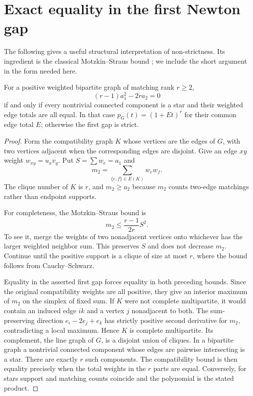 \section{Exact equality in the first Newton gap}\label{sec:firstgap}
The following gives a useful structural interpretation of non-strictness. Its ingredient is the classical Motzkin--Straus bound \cite{MS}; we include the short argument in the form needed here.

\begin{theorem}
For a positive weighted bipartite graph of matching rank $r\ge2$,
\[
 (r-1)a_1^2-2ra_2=0
\]
if and only if every nontrivial connected component is a star and their weighted edge totals are all equal. In that case $p_G(t)=(1+Et)^r$ for their common edge total $E$; otherwise the first gap is strict.
\end{theorem}
\begin{proof}
Form the compatibility graph $K$ whose vertices are the edges of $G$, with two vertices adjacent when the corresponding edges are disjoint. Give an edge $xy$ weight $w_{xy}=u_xv_y$. Put $S=\sum w_e=a_1$ and
\[
 m_2=\sum_{\{e,f\}\in E(K)}w_ew_f.
\]
The clique number of $K$ is $r$, and $m_2\ge a_2$ because $m_2$ counts two-edge matchings rather than endpoint supports.

For completeness, the Motzkin--Straus bound is
\[
 m_2\le\frac{r-1}{2r}S^2.
\]
To see it, merge the weights of two nonadjacent vertices onto whichever has the larger weighted neighbor sum. This preserves $S$ and does not decrease $m_2$. Continue until the positive support is a clique of size at most $r$, where the bound follows from Cauchy--Schwarz.

Equality in the asserted first gap forces equality in both preceding bounds. Since the original compatibility weights are all positive, they give an interior maximum of $m_2$ on the simplex of fixed sum. If $K$ were not complete multipartite, it would contain an induced edge $ik$ and a vertex $j$ nonadjacent to both. The sum-preserving direction $e_i-2e_j+e_k$ has strictly positive second derivative for $m_2$, contradicting a local maximum. Hence $K$ is complete multipartite. Its complement, the line graph of $G$, is a disjoint union of cliques. In a bipartite graph a nontrivial connected component whose edges are pairwise intersecting is a star. There are exactly $r$ such components. The compatibility bound is then equality precisely when the total weights in the $r$ parts are equal. Conversely, for stars support and matching counts coincide and the polynomial is the stated product.
\end{proof}
